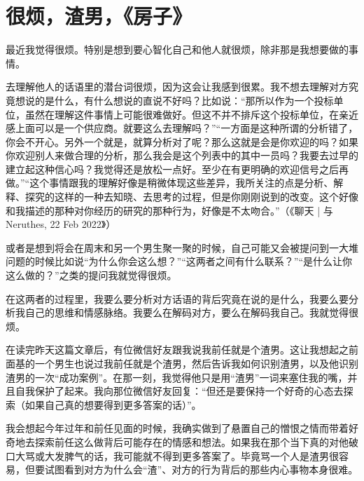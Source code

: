 \chapter{很烦，渣男，《房子》}




最近我觉得很烦。特别是想到要心智化自己和他人就很烦，除非那是我想要做的事情。

去理解他人的话语里的潜台词很烦，因为这会让我感到很累。我不想去理解对方究竟想说的是什么，有什么想说的直说不好吗？比如说：“那所以作为一个投标单位，虽然在理解这件事情上可能很难做好。但这不并不排斥这个投标单位，在亲近感上面可以是一个供应商。就要这么去理解吗？”“一方面是这种所谓的分析错了，你会不开心。另外一个就是，就算分析对了呢？那么这就是会是你欢迎的吗？如果你欢迎别人来做合理的分析，那么我会是这个列表中的其中一员吗？我要去过早的建立起这种信心吗？我觉得还是放松一点好。至少在有更明确的欢迎信号之后再做。”“这个事情跟我的理解好像是稍微体现这些差异，我所关注的点是分析、解释、探究的这样的一种去知晓、去思考的过程，但是你刚刚说到的改变。这个好像和我描述的那种对你经历的研究的那种行为，好像是不太吻合。”（\pozhehao{}《聊天 | 与 Neruthes, 22 Feb 2022》）

或者是想到将会在周末和另一个男生聚一聚的时候，自己可能又会被提问到一大堆问题的时候\pozhehao{}比如说“为什么你会这么想？”“这两者之间有什么联系？”“是什么让你这么做的？”之类的提问\pozhehao{}我就觉得很烦。

在这两者的过程里，我要么要分析对方话语的背后究竟在说的是什么，我要么要分析我自己的思维和情感脉络。我要么在解码对方，要么在解码我自己。我就觉得很烦。


在读完昨天这篇文章后，有位微信好友跟我说我前任就是个渣男。这让我想起之前面基的一个男生也说过我前任就是个渣男，然后告诉我如何识别渣男，以及他识别渣男的一次“成功案例”。在那一刻，我觉得他只是用“渣男”一词来塞住我的嘴，并且自我保护了起来。我向那位微信好友回复：“但还是要保持一个好奇的心态去探索（如果自己真的想要得到更多答案的话）”。


我会想起今年过年和前任见面的时候，我确实做到了悬置自己的憎恨之情而带着好奇地去探索前任这么做背后可能存在的情感和想法。如果我在那个当下真的对他破口大骂或大发脾气的话，我可能就不得到更多答案了。毕竟骂一个人是渣男很容易，但要试图看到对方为什么会“渣”、对方的行为背后的那些内心事物本身很难。



